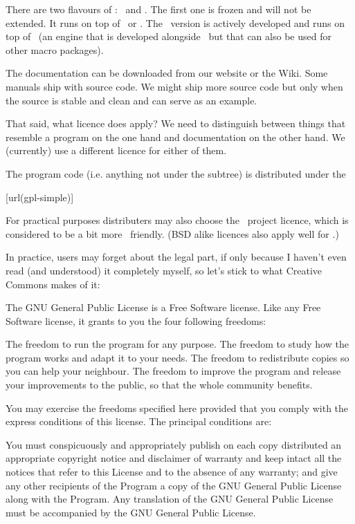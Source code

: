 There are two flavours of \CONTEXT: \MKII\ and \MKIV. The first one is frozen and
will not be extended. It runs on top of \PDFTEX\ or \XETEX. The \MKIV\ version is
actively developed and runs on top of \LUATEX\ (an engine that is developed
alongside \CONTEXT\ but that can also be used for other macro packages).

The documentation can be downloaded from our website or the Wiki. Some manuals
ship with source code. We might ship more source code but only when the source is
stable and clean and can serve as an example.

That said, what licence does apply? We need to distinguish between things that
resemble a program on the one hand and documentation on the other hand. We
(currently) use a different licence for either of them.

\stopsubject

\startsubject[title={The Code}]

The program code (i.e. anything not under the  subtree) is
distributed under the

\startnarrower
{}[url(gpl-simple)]
\stopnarrower

For practical purposes distributers may also choose the \LATEX\ project licence,
which is considered to be a bit more \TEX\ friendly. (BSD alike licences also
apply well for \CONTEXT.)

In practice, users may forget about the legal part, if only because I haven't
even read (and understood) it completely myself, so let's stick to what Creative
Commons makes of it:

\startcolor[blue]
The GNU General Public License is a Free Software license. Like any Free Software
license, it grants to you the four following freedoms:

\startitemize
    \startitem
        The freedom to run the program for any purpose.
    \stopitem
    \startitem
        The freedom to study how the program works and adapt it to your needs.
    \stopitem
    \startitem
        The freedom to redistribute copies so you can help your neighbour.
    \stopitem
    \startitem
        The freedom to improve the program and release your improvements to the
        public, so that the whole community benefits.
    \stopitem
\stopitemize

You may exercise the freedoms specified here provided that you comply with the
express conditions of this license. The principal conditions are:

You must conspicuously and appropriately publish on each copy distributed an
appropriate copyright notice and disclaimer of warranty and keep intact all the
notices that refer to this License and to the absence of any warranty; and give
any other recipients of the Program a copy of the GNU General Public License
along with the Program. Any translation of the GNU General Public License must be
accompanied by the GNU General Public License.

